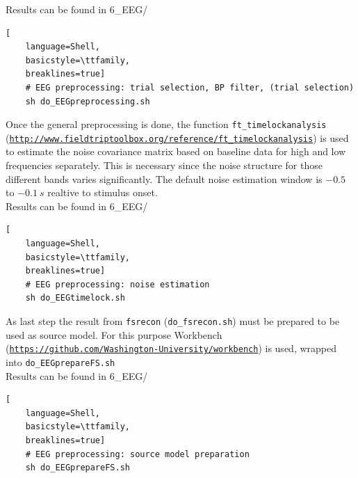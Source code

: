 \documentclass[12pt,a4paper]{scrartcl}
\begin{document}
\noindent Results can be found in 6\_EEG/\\
\begin{lstlisting}[
    language=Shell,
    basicstyle=\ttfamily,
    breaklines=true]
    # EEG preprocessing: trial selection, BP filter, (trial selection)
    sh do_EEGpreprocessing.sh
\end{lstlisting}
Once the general preprocessing is done, the function \texttt{ft\_timelockanalysis} (\href{http://www.fieldtriptoolbox.org/reference/ft\_timelockanalysis}{\nolinkurl{http://www.fieldtriptoolbox.org/reference/ft\_timelockanalysis}}) is used to estimate the noise covariance matrix based on baseline data for high and low frequencies separately. This is necessary since the noise structure for those different bands varies significantly. The default noise estimation window is $-0.5$ to $-0.1~s$ realtive to stimulus onset.\\

\noindent Results can be found in 6\_EEG/\\
\begin{lstlisting}[
    language=Shell,
    basicstyle=\ttfamily,
    breaklines=true]
    # EEG preprocessing: noise estimation
    sh do_EEGtimelock.sh
\end{lstlisting}
As last step the result from \texttt{fsrecon} (\texttt{do\_fsrecon.sh}) must be prepared to be used as source model. For this purpose Workbench (\href{https://github.com/Washington-University/workbench}{\nolinkurl{https://github.com/Washington-University/workbench}}) is used, wrapped into \texttt{do\_EEGprepareFS.sh}\\

\noindent Results can be found in 6\_EEG/\\
\begin{lstlisting}[
    language=Shell,
    basicstyle=\ttfamily,
    breaklines=true]
    # EEG preprocessing: source model preparation
    sh do_EEGprepareFS.sh
\end{lstlisting}
\end{document}
